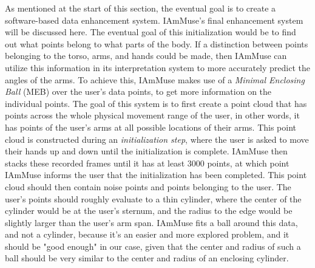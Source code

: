 As mentioned at the start of this section, the eventual goal is to create a software-based data enhancement system. 
IAmMuse's final enhancement system will be discussed here.
The eventual goal of this initialization would be to find out what points belong to what parts of the body.
If a distinction between points belonging to the torso, arms, and hands could be made, then IAmMuse can utilize this information in its interpretation system to more accurately predict the angles of the arms.
To achieve this, IAmMuse makes use of a \textit{Minimal Enclosing Ball} (MEB) over the user's data points, to get more information on the individual points. 
The goal of this system is to first create a point cloud that has points across the whole physical movement range of the user, in other words, it has points of the user's arms at all possible locations of their arms.
This point cloud is constructed during an \textit{initialization step}, where the user is asked to move their hands up and down until the initialization is complete.
IAmMuse then stacks these recorded frames until it has at least 3000 points, at which point IAmMuse informs the user that the initialization has been completed.
This point cloud should then contain noise points and points belonging to the user.
The user's points should roughly evaluate to a thin cylinder, where the center of the cylinder would be at the user's sternum, and the radius to the edge would be slightly larger than the user's arm span.
IAmMuse fits a ball around this data, and not a cylinder, because it's an easier and more explored problem, and it should be "good enough" in our case, given that the center and radius of such a ball should be very similar to the center and radius of an enclosing cylinder.


